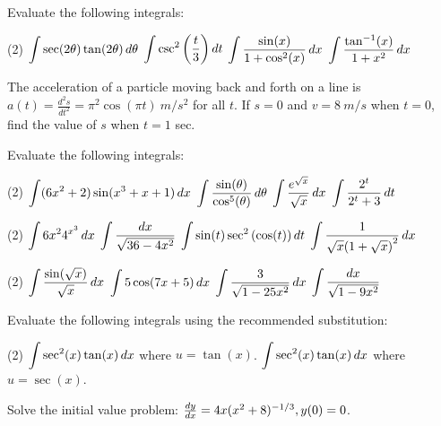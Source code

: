 \documentclass[mathNotesPreamble]{subfiles}
\begin{document}
  \begin{ex*}
    Evaluate the following integrals:
  \end{ex*}
  \begin{tasks}[after-item-skip=\stretch{1}](2)
    \task $\ds\int\sec(2\theta)\tan(2\theta)\,d\theta$
    \task $\ds\int\csc^2\parens{\frac{t}{3}}\,dt$
    \task $\ds\int \frac{\sin(x)}{1+\cos^2(x)}\,dx$
    \task $\ds\int \frac{\tan\inv(x)}{1+x^2}\,dx$
  \end{tasks}
  
  \noindent
  The acceleration of a particle moving back and forth on a line is $a(t)=\frac{d^2s}{dt^2}=\pi^2\cos(\pi t)\ m/s^2$ for all $t$. If $s=0$ and $v=8\ m/s$ when $t=0$, find the value of $s$ when $t=1$ sec.
  \pagebreak
  
  \begin{ex*}
    Evaluate the following integrals:
  \end{ex*}
  \begin{tasks}[after-item-skip=\stretch{1}](2)
    \task $\ds\int(6x^2+2)\sin(x^3+x+1)\,dx$
    \task $\ds\int \frac{\sin(\theta)}{\cos^5(\theta)}\,d\theta$
    \task $\ds\int \frac{e^{\sqrt{x}}}{\sqrt x}\,dx$
    \task $\ds\int \frac{2^t}{2^t+3}\,dt$
  \end{tasks}
  \pagebreak
  
  \begin{tasks}[after-item-skip=\stretch{1}, resume](2)
    \task $\ds\int 6x^2 4^{x^3}\,dx$
    \task $\ds\int \frac{dx}{\sqrt{36-4x^2}}$
    \task $\ds\int \sin(t)\sec^2\parens{\cos(t)}\,dt$
    \task $\ds\int \frac{1}{\sqrt{x}\parens{1+\sqrt{x}}^2}\,dx$
  \end{tasks}
  \pagebreak

  \begin{tasks}[after-item-skip=\stretch{1}, resume](2)
    \task $\ds\int \frac{\sin(\sqrt{x})}{\sqrt x}\,dx$
    \task $\ds\int 5\cos(7x+5)\,dx$
    \task $\ds\int \frac{3}{\sqrt{1-25x^2}}\,dx$
    \task $\ds\int \frac{dx}{\sqrt{1-9x^2}}$
  \end{tasks}
  \pagebreak

  \begin{ex*}
    Evaluate the following integrals using the recommended substitution:
  \end{ex*}
  \begin{tasks}(2)
    \task $\ds\int \sec^2(x)\tan(x)\,dx$ \newline where $u=\tan(x)$.
    \task $\ds\int \sec^2(x)\tan(x)\,dx$ \newline where $u=\sec(x)$.
  \end{tasks}
  \begin{ex*}
  Solve the initial value problem: $\frac{dy}{dx}=4x(x^2+8)\inv[1/3], y(0)=0$.
  \end{ex*}
  \pagebreak
\end{document}
